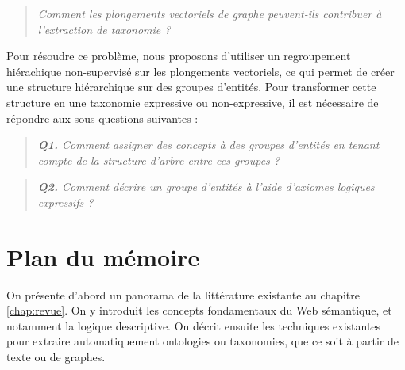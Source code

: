 \begin{quote}
    \emph{Comment les plongements vectoriels de graphe peuvent-ils contribuer à l'extraction de taxonomie ?}
\end{quote}




Pour résoudre ce problème, nous proposons d'utiliser un regroupement hiérachique non-supervisé sur les plongements vectoriels, ce qui permet de créer une structure hiérarchique sur des groupes d'entités. Pour transformer cette structure en une taxonomie expressive ou non-expressive, il est nécessaire de répondre aux sous-questions suivantes :
%
\begin{quote}
    \emph{\textbf{Q1.} Comment assigner des concepts à des groupes d'entités en tenant compte de la structure d'arbre entre ces groupes ?}
\end{quote}

\begin{quote}
    \emph{\textbf{Q2.} Comment décrire un groupe d'entités à l'aide d'axiomes logiques expressifs ?}
\end{quote}







\section{Plan du mémoire}  %



On présente d'abord un panorama de la littérature existante au chapitre \ref{chap:revue}. On y introduit les concepts fondamentaux du Web sémantique, et notamment la logique descriptive. On décrit ensuite les techniques existantes pour extraire automatiquement ontologies ou taxonomies, que ce soit à partir de texte ou de graphes.

